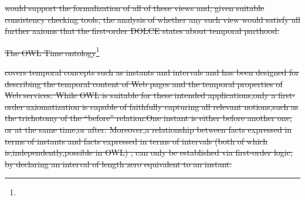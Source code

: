 \documentclass[10pt,fleqn,final]{scrreprt}
\makeatletter
\newcommand*{\eg}{e.g.\@\xspace}
\newcommand*{\DOL}{\ensuremath{\mathsf{DOL}}\xspace}
\providecommand{\DIFdel}[1]{{\protect\color{red}\sout{#1}}}                      %
\makeatother
\begin{document}
\DIFdel{would support the formalization of  all of these views and, given suitable consistency checking tools, the analysis of  whether any such view would satisfy all further axioms that the first-order DOLCE states about temporal parthood. }%

\DIFdel{The OWL Time ontology}\footnote{%
} %
\addtocounter{footnote}{-1}%
\DIFdel{covers temporal concepts such as instants and intervals and has been designed for describing the temporal content of Web pages and the temporal properties of Web services. While OWL is suitable for these intended applications,only a first-order axiomatization is capable of faithfully capturing all relevant notions,such as the trichotomy of the ``before'' relation:One instant is either before another one, or at the same time,or after. Moreover,a relationship between facts expressed in terms of instants and facts expressed in terms of intervals (both of which is,independently,possible in OWL) , can only be established via first-order logic,}%
\DIFdel{by declaring an interval of length zero equivalent to an instant. 
}%
\end{document}
